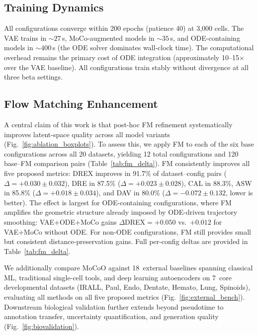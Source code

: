 \documentclass[journal]{IEEEtran}
\begin{document}
\subsection{Training Dynamics}
\label{sec:results:training}

All configurations converge within 200 epochs (patience 40) at 3{,}000 cells. The VAE trains in ${\sim}27$\,s, MoCo-augmented models in ${\sim}35$\,s, and ODE-containing models in ${\sim}400$\,s (the ODE solver dominates wall-clock time). The computational overhead remains the primary cost of ODE integration (approximately 10--15$\times$ over the VAE baseline). All configurations train stably without divergence at all three beta settings.

\subsection{Flow Matching Enhancement}
\label{sec:results:fm}

A central claim of this work is that post-hoc FM refinement systematically improves latent-space quality across all model variants (Fig.~\ref{fig:ablation_boxplots}). To assess this, we apply FM to each of the six base configurations across all 20 datasets, yielding 12 total configurations and 120 base--FM comparison pairs (Table~\ref{tab:fm_delta}). FM consistently improves all five proposed metrics: DREX improves in 91.7\% of dataset--config pairs ($\Delta{=}+0.030 \pm 0.032$), DRE in 87.5\% ($\Delta{=}+0.023 \pm 0.028$), CAL in 88.3\%, ASW in 85.8\% ($\Delta{=}+0.018 \pm 0.034$), and DAV in 80.0\% ($\Delta{=}-0.072 \pm 0.132$, lower is better). The effect is largest for ODE-containing configurations, where FM amplifies the geometric structure already imposed by ODE-driven trajectory smoothing: VAE+ODE+MoCo gains $\Delta$DREX$=+0.050$ vs.\ $+0.012$ for VAE+MoCo without ODE. For non-ODE configurations, FM still provides small but consistent distance-preservation gains. Full per-config deltas are provided in Table~\ref{tab:fm_delta}.




We additionally compare MoCoO against 18~external baselines spanning classical ML, traditional single-cell tools, and deep learning autoencoders on 7~core developmental datasets (IRALL, Paul, Endo, Dentate, Hemato, Lung, Spinoids), evaluating all methods on all five proposed metrics (Fig.~\ref{fig:external_bench}). Downstream biological validation further extends beyond pseudotime to annotation transfer, uncertainty quantification, and generation quality (Fig.~\ref{fig:biovalidation}).
\end{document}
